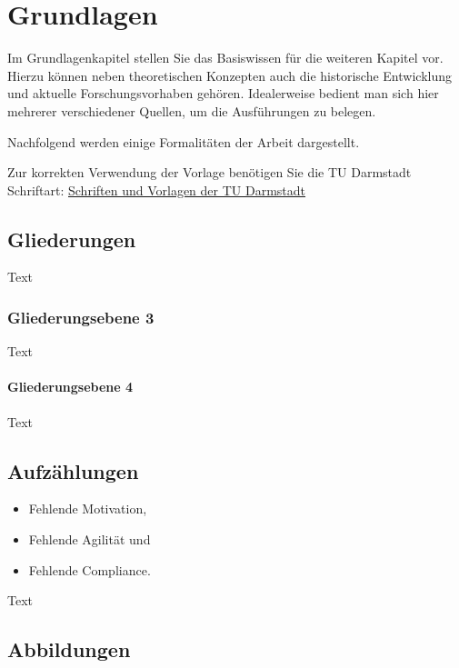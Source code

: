 \section{Grundlagen}
Im Grundlagenkapitel stellen Sie das Basiswissen für die weiteren Kapitel vor. Hierzu können neben theoretischen Konzepten auch die historische Entwicklung und aktuelle Forschungsvorhaben gehören. Idealerweise bedient man sich hier mehrerer verschiedener Quellen, um die Ausführungen zu belegen.

Nachfolgend werden einige Formalitäten der Arbeit dargestellt.

Zur korrekten Verwendung der Vorlage benötigen Sie die TU Darmstadt Schriftart: \href{https://www.tu-darm-stadt.de/kommunikation_und_medien/corporate_design_1/schriften_und_vorlagen/index.en.jsp}{Schriften und Vorlagen der TU Darmstadt}
\subsection{Gliederungen}
Text
\subsubsection{Gliederungsebene 3}
Text
\paragraph{Gliederungsebene 4}
Text
\subsection{Aufzählungen}
\begin{itemize}
	\item Fehlende Motivation,
	\item Fehlende Agilität und 
	\item Fehlende Compliance.
\end{itemize}

Text 
\newpage
\subsection{Abbildungen}

